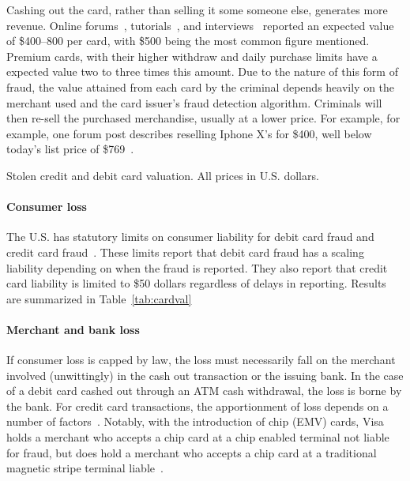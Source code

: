 Cashing out the card, rather than selling it some someone else, generates more revenue. Online forums~\cite{makingFirstMoney},
tutorials~\cite{cardingNewbieGuide, howToSucceedInStore}, and interviews~\cite{viceInterviewWithCarder} reported an
expected value of \$400--800 per card, with \$500 being the most common figure mentioned. Premium cards, with their
higher withdraw and daily purchase limits have a expected value two to three times this amount. Due to the nature of
this form of fraud, the value attained from each card by the criminal depends heavily on the merchant used and the card
issuer's fraud detection algorithm. Criminals will then re-sell the purchased merchandise, usually at a lower price.
For example, for example, one forum post describes reselling Iphone X's for \$400, well below today's list price of
\$769~\cite{iphoneXSale}.

\begin{table}
    
    \caption{Stolen credit and debit card valuation. All prices in U.S. dollars.}
    \label{tab:cardval}
\end{table}

\paragraph{Consumer loss}
The U.S. has statutory limits on consumer liability for debit card fraud and credit card
fraud~\cite{15usc1643,15usc1693g}. These limits report that debit card fraud has a scaling liability depending on
when the fraud is reported. They also report that credit card liability is limited to \$50 dollars regardless
of delays in reporting. Results are summarized in Table~\ref{tab:cardval}

\paragraph{Merchant and bank loss}
If consumer loss is capped by law, the loss must necessarily fall on the merchant involved (unwittingly) in the cash out
transaction or the issuing bank. In the case of a debit card cashed out through an ATM cash withdrawal, the loss is borne
by the bank. For credit card transactions, the apportionment of loss depends on a number of
factors~\cite{card-acceptance-guidelines-for-merchants}. Notably, with the introduction of chip (EMV) cards, Visa holds
a merchant who accepts a chip card at a chip enabled terminal not liable for fraud, but does hold a merchant who
accepts a chip card at a traditional magnetic stripe terminal liable~\cite{visa-liability-shift}.

